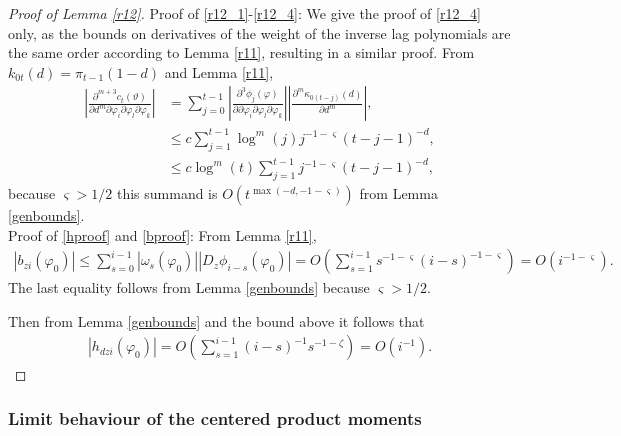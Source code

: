 {{\begin{lemma}
\end{lemma}
\begin{proof}[Proof of Lemma \ref{r12}] Proof of \eqref{r12_1}-\eqref{r12_4}: We give the proof of \eqref{r12_4} only, as the bounds on derivatives of the weight of the inverse lag polynomials are the same order according to Lemma \ref{r11}, resulting in a similar proof. From $k_{0t}(d) = \pi_{t-1}(1-d)$ and Lemma \ref{r11},
\begin{align*}
     \left|\frac{\partial^{m+3} c_t(\vartheta)}{ \partial d^m \partial \varphi_i \partial \varphi_l \partial \varphi_k } \right| &= \sum_{j = 0}^{t-1}  \left|\frac{\partial^3 \phi_j(\varphi)}{\partial  \partial \varphi_i \partial \varphi_l \partial \varphi_k} \right| \left| \frac{\partial^m \kappa_{0(t-j)}(d)}{\partial d^m} \right|, \\
     &\leq c \sum_{j = 1}^{t-1} \log^m(j) j^{-1-\varsigma} (t-j-1)^{-d}, \\
     &\leq c \log^m(t) \sum_{j = 1}^{t-1} j^{-1-\varsigma} (t-j-1)^{-d},
\end{align*}
because $\varsigma > 1/2$ this summand is $O(t^{\max(-d,-1-\varsigma)})$ from Lemma \ref{genbounds}. \\
Proof of \eqref{hproof} and \eqref{bproof}: From Lemma \ref{r11}, 
\begin{align*}
    |b_{zi}(\varphi_0)| \leq \sum_{s = 0}^{i-1} |\omega_s(\varphi_0) | |D_{z} \phi_{i-s}(\varphi_0)| = O(\sum_{s = 1}^{i-1}  s^{-1-\varsigma} (i-s)^{-1-\varsigma} ) = O(i^{-1-\varsigma}).
\end{align*}
The last equality follows from Lemma \ref{genbounds} because $\varsigma > 1/2$. 

Then from Lemma \ref{genbounds} and the bound above it follows that 
\begin{align*}
    |h_{dzi}(\varphi_0)| = O(\sum_{s = 1}^{i-1} (i-s)^{-1} s^{-1-\zeta} ) = O(i^{-1}).
\end{align*}
\end{proof}


\subsubsection{Limit behaviour of the centered product moments} \label{UB2}


}}
